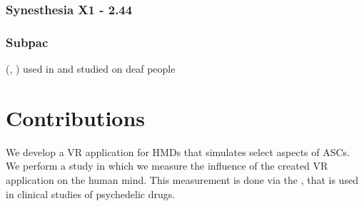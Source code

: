 \subsubsection{Synesthesia X1 - 2.44}
\autocite{synesthesia2021x1}

\subsubsection{Subpac}
(\textcite{subpac2013subpac}, \textcite{drempetic2017wearable})
used in \autocite{zimmermann2016longing}
and studied on deaf people \autocite{schmitz2020hearing}


\section{Contributions}
We develop a \ac{VR} application for \acp{HMD} that simulates select aspects of \acp{ASC}.
We perform a study in which we measure the influence of the created \ac{VR} application on the human mind. This measurement is done via the , that is used in clinical studies of psychedelic drugs.

